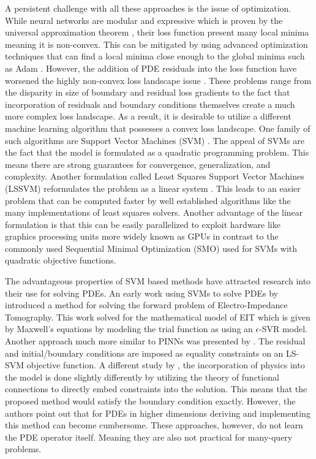 A persistent challenge with all these approaches is the issue of optimization. While neural networks are modular and expressive which is proven by the universal approximation theorem \autocite{cybenkoApproximationSuperpositionsSigmoidal1989,hornikMultilayerFeedforwardNetworks1989}, their loss function present many local minima meaning it is non-convex. This can be mitigated by using advanced optimization techniques that can find a local minima close enough to the global minima such as Adam \autocite{shresthaReviewDeepLearning2019,soydanerComparisonOptimizationAlgorithms2020}. However, the addition of PDE residuals into the loss function have worsened the highly non-convex loss landscape issue \autocite{rathoreChallengesTrainingPINNs2024,NEURIPS2021_df438e52,basirCriticalInvestigationFailure2022}. These problems range from the disparity in size of boundary and residual loss gradients to the fact that incorporation of residuals and boundary conditions themselves create a much more complex loss landscape. As a result, it is desirable to utilize a different machine learning algorithm that possesses a convex loss landscape. One family of such algorithms are Support Vector Machines (SVM) \autocite{vapnikNatureStatisticalLearning2000}. The appeal of SVMs are the fact that the model is formulated as a quadratic programming problem. This means there are strong guarantees for convergence, generalization, and complexity. Another formulation called Least Squares Support Vector Machines (LSSVM) reformulates the problem as a linear system \autocite{suykensLeastSquaresSupport2005}. This leads to an easier problem that can be computed faster by well established algorithms like the many implementations of least squares solvers. Another advantage of the linear formulation is that this can be easily parallelized to exploit hardware like graphics processing units more widely known as GPUs in contrast to the commonly used Sequential Minimal Optimization (SMO) used for SVMs with quadratic objective functions.

The advantageous properties of SVM based methods have attracted research into their use for solving PDEs. An early work using SVMs to solve PDEs by \textcite{youxiwuSVMSolvingForward2005} introduced a method for solving the forward problem of Electro-Impedance Tomography. This work solved for the mathematical model of EIT which is given by Maxwell's equations by modeling the trial function as using an \(\epsilon \)-SVR model. Another approach much more similar to PINNs was presented by \textcite{mehrkanoonLearningSolutionsPartial2015}. The residual and initial/boundary conditions are imposed as equality constraints on an LS-SVM objective function. A different study by \textcite{leakeAnalyticallyEmbeddingDifferential2019}, the incorporation of physics into the model is done slightly differently by utilizing the theory of functional connections to directly embed constraints into the solution. This means that the proposed method would satisfy the boundary condition exactly. However, the authors point out that for PDEs in higher dimensions deriving and implementing this method can become cumbersome. These approaches, however, do not learn the PDE operator itself. Meaning they are also not practical for many-query problems.

